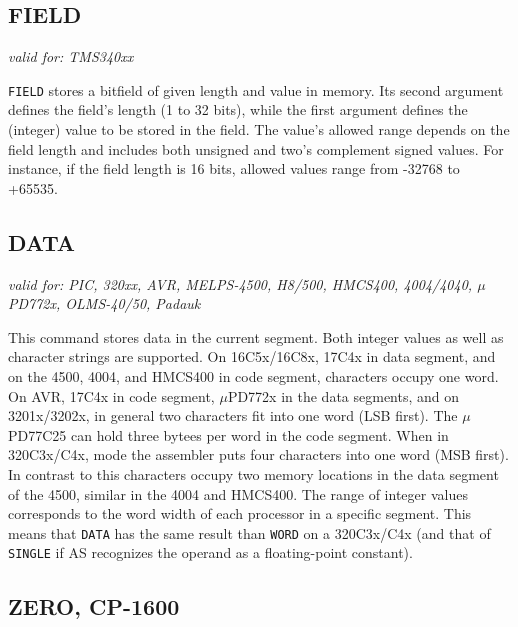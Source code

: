 \documentclass[12pt,twoside]{report}
\makeatletter
\newcommand{\tty}[1]{{\tt #1}}
\newcommand{\ttindex}[1]{\index{#1@{\tt #1}}}
\newcommand{\asname}{{AS}}
\makeatother
\begin{document}
 
\subsection{FIELD}
\ttindex{FIELD}
 
{\em valid for: TMS340xx}
 
\tty{FIELD} stores a bitfield of given length and value in memory. Its second
argument defines the field's length (1 to 32 bits), while the first argument
defines the (integer) value to be stored in the field.  The value's allowed
range depends on the field length and includes both unsigned and two's complement
signed values.  For instance, if the field length is 16 bits, allowed values
range from -32768 to +65535.
 

\subsection{DATA}
\ttindex{DATA}

{\em valid for: PIC, 320xx, AVR, MELPS-4500, H8/500,
     HMCS400, 4004/4040, $\mu$PD772x, OLMS-40/50, Padauk}

This command stores data in the current segment.  Both integer
values as well as character strings are supported.  On
16C5x/16C8x, 17C4x in data segment, and on the 4500, 4004, and
HMCS400 in code segment, characters occupy one word.  On AVR,
17C4x in code segment, $\mu$PD772x in the data segments, and on
3201x/3202x, in general two characters fit into one word (LSB
first).  The $\mu$PD77C25 can hold three bytees per word in the
code segment.  When in 320C3x/C4x, mode the assembler puts four
characters into one word (MSB first).  In contrast to this
characters occupy two memory locations in the data segment of the
4500, similar in the 4004 and HMCS400.  The range of integer
values corresponds to the word width of each processor in a
specific segment.  This means that \tty{DATA} has the same result
than \tty{WORD} on a 320C3x/C4x (and that of \tty{SINGLE} if \asname{}
recognizes the operand as a floating-point constant).


\subsection{ZERO, CP-1600}
\ttindex{ZERO}
\end{document}

